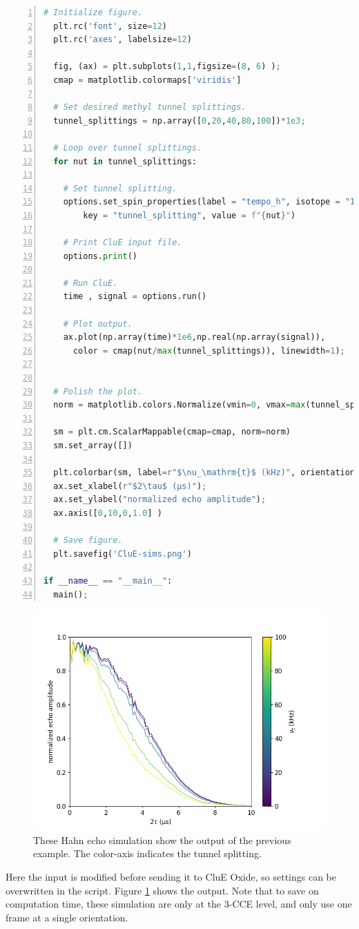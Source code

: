 \documentclass{book}
\begin{document}
\begin{lstlisting}[frame=single,numbers=left,language=python]
  # Initialize figure.
  plt.rc('font', size=12)
  plt.rc('axes', labelsize=12)

  fig, (ax) = plt.subplots(1,1,figsize=(8, 6) );
  cmap = matplotlib.colormaps['viridis']

  # Set desired methyl tunnel splittings. 
  tunnel_splittings = np.array([0,20,40,80,100])*1e3;

  # Loop over tunnel splittings.
  for nut in tunnel_splittings:

    # Set tunnel splitting.
    options.set_spin_properties(label = "tempo_h", isotope = "1H",
        key = "tunnel_splitting", value = f"{nut}")

    # Print CluE input file.
    options.print()
   
    # Run CluE.
    time , signal = options.run()

    # Plot output.
    ax.plot(np.array(time)*1e6,np.real(np.array(signal)),
      color = cmap(nut/max(tunnel_splittings)), linewidth=1);


  # Polish the plot.
  norm = matplotlib.colors.Normalize(vmin=0, vmax=max(tunnel_splittings)*1e-3)
  
  sm = plt.cm.ScalarMappable(cmap=cmap, norm=norm)
  sm.set_array([])

  plt.colorbar(sm, label=r"$\nu_\mathrm{t}$ (kHz)", orientation="vertical")  
  ax.set_xlabel(r"$2\tau$ (μs)");
  ax.set_ylabel("normalized echo amplitude");
  ax.axis([0,10,0,1.0] )

  # Save figure.
  plt.savefig('CluE-sims.png')

if __name__ == "__main__":
  main();
\end{lstlisting}
%
\begin{figure} [H]
	\centering
	\includegraphics[width=0.75\linewidth]{figs/fig_pyCluE-sims.png}
  \caption{These Hahn echo simulation show the output of the previous example.
  The color-axis indicates the tunnel splitting.
  }
  \label{fig:pyclue_out}
\end{figure}
%
Here the input is modified before sending it to CluE Oxide, 
so settings can be overwritten in the script.
Figure \ref{fig:pyclue_out} shows the output.  
Note that to save on computation time, these simulation are only at the 3-CCE 
level, and only use one frame at a single orientation.
\end{document}
